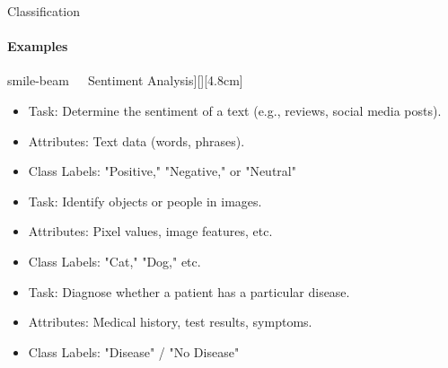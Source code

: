 \documentclass[aspectratio=169]{beamer}
\begin{document}
\begin{frame}{Classification}
    \framesubtitle{Examples}

    \vspace{-0.8cm}
    \begin{minipage}[t]{0.32\textwidth}
    
        \begin{coloredblock}[blue][\centering\faIcon[regular]{smile-beam}~~~Sentiment Analysis][\footnotesize][4.8cm]
            \begin{itemize}
                \item \scriptsize Task: Determine the sentiment of a text (e.g., reviews, social media posts).
                \item \scriptsize Attributes: Text data (words, phrases).
                \item \scriptsize Class Labels: "Positive," "Negative," or "Neutral"
            \end{itemize}
        \end{coloredblock}

        \begin{coloredblock}
                \begin{itemize}
                    \item \scriptsize Task: Identify objects or people in images.
                    \item \scriptsize Attributes: Pixel values, image features, etc.
                    \item \scriptsize Class Labels: "Cat," "Dog," etc.
                \end{itemize}
        \end{coloredblock}
        
    \end{minipage}
    \hfill
    \begin{minipage}[t]{0.32\textwidth}
        \begin{coloredblock}
            \begin{itemize}
                \item \scriptsize Task: Diagnose whether a patient has a particular disease.
                \item \scriptsize Attributes: Medical history, test results, symptoms.
                \item \scriptsize Class Labels: "Disease" / "No Disease"
            \end{itemize}
        \end{coloredblock}


\end{minipage}
\end{frame}
\end{document}
